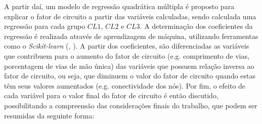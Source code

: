 A partir daí, um modelo de regressão quadrática múltipla é proposto para explicar o fator de circuito a partir das variáveis calculadas, sendo calculada uma regressão para cada grupo $CL1$, $CL2$ e $CL3$.
A determinação dos coeficientes da regressão é realizada através de aprendizagem de máquina, utilizando ferramentas como o \textit{Scikit-learn} (, \citeyear{pedregosa2011scikit}).
A partir dos coeficientes, são diferenciadas as variáveis que contribuem para o aumento do fator de circuito (e.g. comprimento de vias, porcentagem de vias de mão única) das variáveis que possuem relação inversa ao fator de circuito, ou seja, que diminuem o valor do fator de circuito quando estas têm seus valores aumentados (e.g. conectividade dos nós).
Por fim, o efeito de cada variável para o valor final do fator de circuito é então discutido, possibilitando a compreensão das considerações finais do trabalho, que podem ser resumidas da seguinte forma:
%
